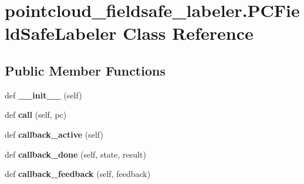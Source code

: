 \hypertarget{classpointcloud__fieldsafe__labeler_1_1PCFieldSafeLabeler}{}\section{pointcloud\+\_\+fieldsafe\+\_\+labeler.\+P\+C\+Field\+Safe\+Labeler Class Reference}
\label{classpointcloud__fieldsafe__labeler_1_1PCFieldSafeLabeler}
\subsection*{Public Member Functions}
\begin{DoxyCompactItemize}
\item 
\mbox{\label{classpointcloud__fieldsafe__labeler_1_1PCFieldSafeLabeler_a11170dc974680d18f9c7ef3bb9a06c44}} 
def {\bfseries \+\_\+\+\_\+init\+\_\+\+\_\+} (self)
\item 
\mbox{\label{classpointcloud__fieldsafe__labeler_1_1PCFieldSafeLabeler_abc1df43662cb51a913208f1204606232}} 
def {\bfseries call} (self, pc)
\item 
\mbox{\label{classpointcloud__fieldsafe__labeler_1_1PCFieldSafeLabeler_ac370a8cf5082aef2b46e4df68af97660}} 
def {\bfseries callback\+\_\+active} (self)
\item 
\mbox{\label{classpointcloud__fieldsafe__labeler_1_1PCFieldSafeLabeler_a1035bd8fa7638fb4c61d1792e35d654e}} 
def {\bfseries callback\+\_\+done} (self, state, result)
\item 
\mbox{\label{classpointcloud__fieldsafe__labeler_1_1PCFieldSafeLabeler_a6e11e62f44bd5de706a9f023c33fdfae}} 
def {\bfseries callback\+\_\+feedback} (self, feedback)
\end{DoxyCompactItemize}
